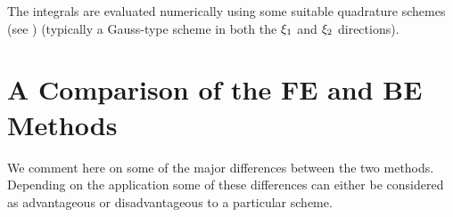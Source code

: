 The integrals are evaluated numerically using some suitable quadrature schemes
(see ) (typically a Gauss-type scheme in both the $\xi_{1}$
and $\xi_{2}$ directions).




\section{A Comparison of the FE and BE Methods}

We comment here on some of the major differences between the two methods.
Depending on the application some of these differences can either be
considered as advantageous or disadvantageous to a particular scheme.

